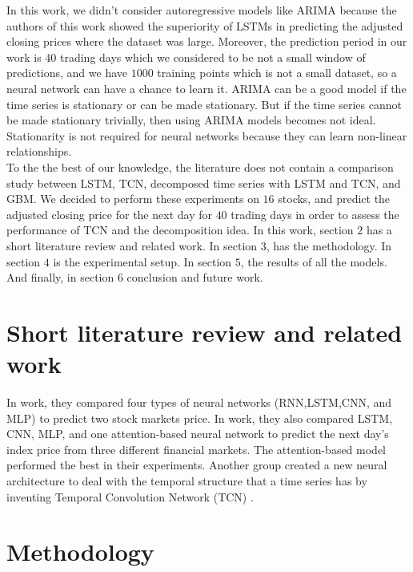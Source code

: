 \documentclass[12pt, A4]{article}
\begin{document}
In this work, we didn't consider autoregressive models like ARIMA because the authors of this work \cite{siami2018comparison} showed the superiority of LSTMs in predicting the adjusted closing prices where the dataset was large. Moreover, the prediction period in our work is $40$ trading days which we considered to be not a small window of predictions, and we have $1000$ training points which is not a small dataset, so a neural network can have a chance to learn it. ARIMA can be a good model if the time series is stationary or can be made stationary. But if the time series cannot be made stationary trivially, then using ARIMA models becomes not ideal. Stationarity is not required for neural networks because they can learn non-linear relationships. \\

To the the best of our knowledge, the literature does not contain a comparison study between LSTM, TCN, decomposed time series with LSTM and TCN, and GBM. We decided to perform these experiments on $16$ stocks, and predict the adjusted closing price for the next day for $40$ trading days in order to assess the performance of TCN and the decomposition idea. In this work, section $2$ has a short literature review and related work. In section $3$, has the methodology. In section $4$ is the experimental setup. In section $5$, the results of all the models. And finally, in section $6$ conclusion and future work.

\section{Short literature review and related work}

In \cite{hiransha2018nse} work, they compared four types of neural networks (RNN,LSTM,CNN, and MLP) to predict two stock markets price. In \cite{gao2020application} work, they also compared LSTM, CNN, MLP, and one attention-based neural network to predict the next day's index price from three different financial markets. The attention-based model performed the best in their experiments. Another group created a new neural architecture to deal with the temporal structure that a time series has by inventing Temporal Convolution Network (TCN)  \cite{lea2017temporal}. 
\section{Methodology}
\end{document}
